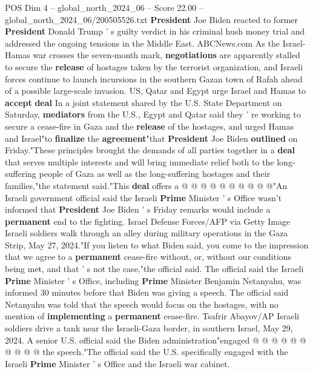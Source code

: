 \begin{textsample}{POS Dim 4 – global\_north\_2024\_06 – Score 22.00 – global\_north\_2024\_06/200505526.txt}  \label{ex:f4_pos_150}
\textbf{President} Joe Biden reacted to former \textbf{President} Donald Trump ' s guilty verdict in his criminal hush money trial and addressed the ongoing tensions in the Middle East.
ABCNews.com As the Israel-Hamas war crosses the seven-month mark, \textbf{negotiations} are apparently stalled to secure the \textbf{release} of hostages taken by the terrorist organization, and Israeli forces continue to launch incursions in the southern Gazan town of Rafah ahead of a possible large-scale invasion.
US, Qatar and Egypt urge Israel and Hamas to \textbf{accept} \textbf{deal} In a joint statement shared by the U.S.
State Department on Saturday, \textbf{mediators} from the U.S., Egypt and Qatar said they ' re working to secure a cease-fire in Gaza and the \textbf{release} of the hostages, and urged Hamas and Israel"to \textbf{finalize} the \textbf{agreement}"that \textbf{President} Joe Biden \textbf{outlined} on Friday."These principles brought the demands of all parties together in a \textbf{deal} that serves multiple interests and will bring immediate relief both to the long-suffering people of Gaza as well as the long-suffering hostages and their families,"the statement said."This \textbf{deal} offers a @ @ @ @ @ @ @ @ @ @"An Israeli government official said the Israeli \textbf{Prime} Minister ' s Office wasn't informed that \textbf{President} Joe Biden ' s Friday remarks would include a \textbf{permanent} end to the fighting.
Israel Defense Forces/AFP via Getty Image Israeli soldiers walk through an alley during military operations in the Gaza Strip, May 27, 2024."If you listen to what Biden said, you come to the impression that we agree to a \textbf{permanent} cease-fire without, or, without our conditions being met, and that ' s not the case,"the official said.
The official said the Israeli \textbf{Prime} Minister ' s Office, including \textbf{Prime} Minister Benjamin Netanyahu, was informed 30 minutes before that Biden was giving a speech.
The official said Netanyahu was told that the speech would focus on the hostages, with no mention of \textbf{implementing} a \textbf{permanent} cease-fire.
Tsafrir Abayov/AP Israeli soldiers drive a tank near the Israeli-Gaza border, in southern Israel, May 29, 2024.
A senior U.S. official said the Biden administration"engaged @ @ @ @ @ @ @ @ @ @ the speech."The official said the U.S. specifically engaged with the Israeli \textbf{Prime} Minister ' s Office and the Israeli war cabinet.

\end{textsample}
